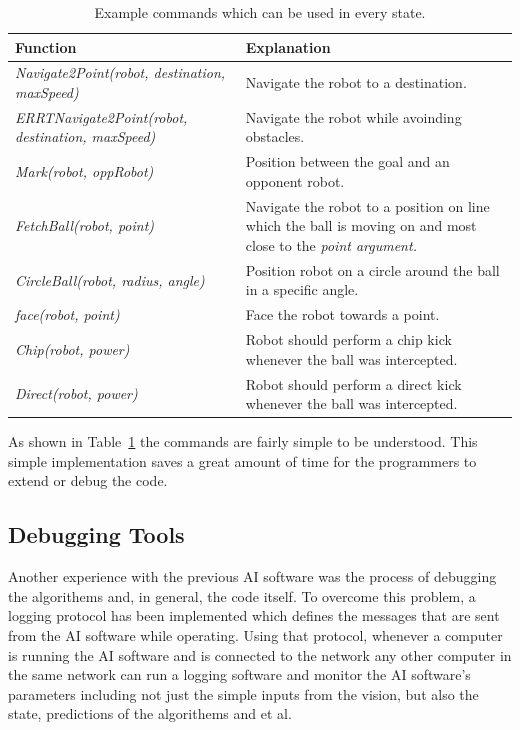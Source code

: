 \documentclass[runningheads]{llncs}
\begin{document}
\begin{table}
\caption{Example commands which can be used in every state.}\label{tab1}
\begin{tabular}{|p{7.5cm}|p{6cm}|}
\hline
Function &  Explanation \\
\hline
{\itshape Navigate2Point(robot, destination, maxSpeed)} & Navigate the robot to a destination.\\
{\itshape ERRTNavigate2Point(robot, destination, maxSpeed)} & Navigate the robot while avoinding obstacles.\\
{\itshape Mark(robot, oppRobot)} & Position between the goal and an opponent robot.\\
{\itshape FetchBall(robot, point)} & Navigate the robot to a position on line which the ball is moving on and most close to the \itshape{point} argument.\\
{\itshape CircleBall(robot, radius, angle)} & Position robot on a circle around the ball in a specific angle.\\
{\itshape face(robot, point)} & Face the robot towards a point.\\
{\itshape Chip(robot, power)} & Robot should perform a chip kick whenever the ball was intercepted.\\
{\itshape Direct(robot, power)} & Robot should perform a direct kick whenever the ball was intercepted.\\
\hline
\end{tabular}
\end{table}

As shown in Table~\ref{tab1} the commands are fairly simple to be understood. This simple implementation saves a great amount of time for the programmers to extend or debug the code.

\subsection{Debugging Tools}
Another experience with the previous AI software was the process of debugging the algorithems and, in general, the code itself. To overcome this problem, a logging protocol has been implemented which defines the messages that are sent from the AI software while operating. Using that protocol, whenever a computer is running the AI software and is connected to the network any other computer in the same network can run a logging software and monitor the AI software's parameters including not just the simple inputs from the vision, but also the state, predictions of the algorithems and et al.
\end{document}
